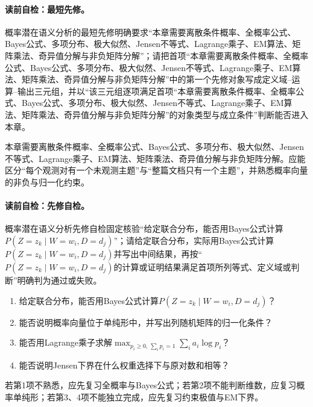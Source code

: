 \paragraph{读前自检：最短先修。}概率潜在语义分析的最短先修明确要求“本章需要离散条件概率、全概率公式、Bayes公式、多项分布、极大似然、Jensen不等式、Lagrange乘子、EM算法、矩阵乘法、奇异值分解与非负矩阵分解”；请把首项“本章需要离散条件概率、全概率公式、Bayes公式、多项分布、极大似然、Jensen不等式、Lagrange乘子、EM算法、矩阵乘法、奇异值分解与非负矩阵分解”中的第一个先修对象写成定义域--运算--输出三元组，并以“该三元组逐项满足首项“本章需要离散条件概率、全概率公式、Bayes公式、多项分布、极大似然、Jensen不等式、Lagrange乘子、EM算法、矩阵乘法、奇异值分解与非负矩阵分解”的对象类型与成立条件”判断能否进入本章。\par

\begin{prerequisitebox}
本章需要离散条件概率、全概率公式、Bayes公式、多项分布、极大似然、Jensen不等式、Lagrange乘子、EM算法、矩阵乘法、奇异值分解与非负矩阵分解。应能区分“每个观测对有一个未观测主题”与“整篇文档只有一个主题”，并熟悉概率向量的非负与归一化约束。
\end{prerequisitebox}

\label{struct:V4-C06-CH03}
\paragraph{读前自检：先修自检。}概率潜在语义分析先修自检固定核验“给定联合分布，能否用Bayes公式计算$P(Z=z_k\mid W=w_i,D=d_j)$”；请给定联合分布，实际用Bayes公式计算$P(Z=z_k\mid W=w_i,D=d_j)$并写出中间结果，再按“$P(Z=z_k\mid W=w_i,D=d_j)$的计算或证明结果满足首项所列等式、定义域或判断”明确判为通过或失败。\par

\begin{precheckbox}
\begin{enumerate}[leftmargin=2.2em]
  \item 给定联合分布，能否用Bayes公式计算$P(Z=z_k\mid W=w_i,D=d_j)$？
  \item 能否说明概率向量位于单纯形中，并写出列随机矩阵的归一化条件？
  \item 能否用Lagrange乘子求解$\max_{p_i\ge0,\,\sum_i p_i=1}\sum_i a_i\log p_i$？
  \item 能否说明Jensen下界在什么权重选择下与原对数和相等？
\end{enumerate}
若第1项不熟悉，应先复习全概率与Bayes公式；若第2项不能判断维数，应复习概率单纯形；若第3、4项不能独立完成，应先复习约束极值与EM下界。
\end{precheckbox}

